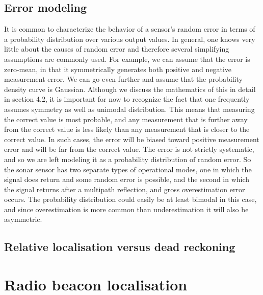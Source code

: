 \subsection{Error modeling}
It is common to characterize the behavior of a sensor’s
random error in terms of a probability distribution over various output values.
In general,
one knows very little about the causes of random error and therefore several simplifying
assumptions are commonly used. For example, we can assume that the error is zero-mean,
in that it symmetrically generates both positive and negative measurement error. We can
go even further and assume that the probability density curve is Gaussian. Although we discuss 
the mathematics of this in detail in section 4.2, it is important for now to recognize the
fact that one frequently assumes symmetry as well as unimodal distribution. This means
that measuring the correct value is most probable, and any measurement that is further
away from the correct value is less likely than any measurement that is closer to the correct
value. In such cases, the error will be
biased toward positive measurement error and will be far from the correct value. The error
is not strictly systematic, and so we are left modeling it as a probability distribution of
random error. So the sonar sensor has two separate types of operational modes, one in
which the signal does return and some random error is possible, and the second in which
the signal returns after a multipath reflection, and gross overestimation error occurs. The
probability distribution could easily be at least bimodal in this case, and since overestimation 
is more common than underestimation it will also be asymmetric.

\subsection{Relative localisation versus dead reckoning}

\section{Radio beacon localisation}

